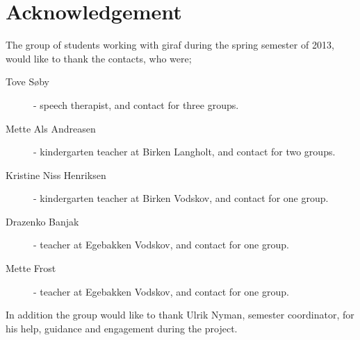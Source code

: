 \section{Acknowledgement}
The group of students working with \ac{giraf} during the spring semester of 2013, would like to thank the contacts, who were;

\begin{description}
\item [Tove S{\o}by] - speech therapist, and contact for three groups.
\item [Mette Als Andreasen] - kindergarten teacher at Birken Langholt, and contact for two groups.
\item [Kristine Niss Henriksen] - kindergarten teacher at Birken Vodskov, and contact for one group.
\item [Drazenko Banjak] - teacher at Egebakken Vodskov, and contact for one group.
\item [Mette Frost] - teacher at Egebakken Vodskov, and contact for one group.
\end{description}

In addition the group would like to thank Ulrik Nyman, semester coordinator, for his help, guidance and engagement during the project.
